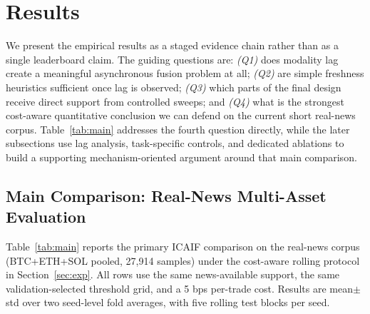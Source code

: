 \section{Results}
\label{sec:results}

We present the empirical results as a staged evidence chain rather than as a single leaderboard claim.
The guiding questions are:
\emph{(Q1)} does modality lag create a meaningful asynchronous fusion problem at all;
\emph{(Q2)} are simple freshness heuristics sufficient once lag is observed;
\emph{(Q3)} which parts of the final design receive direct support from controlled sweeps; and
\emph{(Q4)} what is the strongest cost-aware quantitative conclusion we can defend on the current short real-news corpus.
Table~\ref{tab:main} addresses the fourth question directly, while the later subsections use lag analysis, task-specific controls, and dedicated ablations to build a supporting mechanism-oriented argument around that main comparison.

\subsection{Main Comparison: Real-News Multi-Asset Evaluation}
\label{sec:main}

Table~\ref{tab:main} reports the primary ICAIF comparison on the \dataset{} real-news corpus (BTC+ETH+SOL pooled, 27{,}914 samples) under the cost-aware rolling protocol in Section~\ref{sec:exp}.
All rows use the same news-available support, the same validation-selected threshold grid, and a 5 bps per-trade cost.
Results are mean$\pm$std over two seed-level fold averages, with five rolling test blocks per seed.

